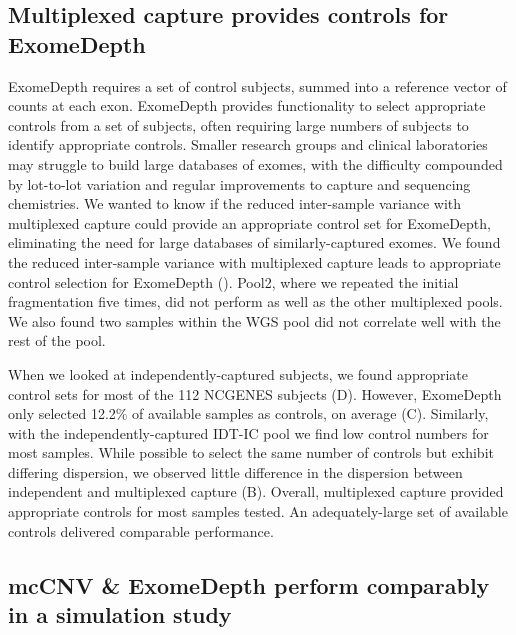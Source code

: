 \documentclass{bmcart}\usepackage[]{graphicx}\usepackage[]{color}
\begin{document}
\subsection{Multiplexed capture provides controls for ExomeDepth}

ExomeDepth requires a set of control subjects, summed into a reference vector of counts at each exon.
ExomeDepth provides functionality to select appropriate controls from a set of subjects, often requiring large numbers of subjects to identify appropriate controls.
Smaller research groups and clinical laboratories may struggle to build large databases of exomes, with the difficulty compounded by lot-to-lot variation and regular improvements to capture and sequencing chemistries.
We wanted to know if the reduced inter-sample variance with multiplexed capture could provide an appropriate control set for ExomeDepth, eliminating the need for large databases of similarly-captured exomes.
We found the reduced inter-sample variance with multiplexed capture leads to appropriate control selection for ExomeDepth ().
Pool2, where we repeated the initial fragmentation five times, did not perform as well as the other multiplexed pools.
We also found two samples within the WGS pool did not correlate well with the rest of the pool.

When we looked at independently-captured subjects, we found appropriate control sets for most of the 112 NCGENES subjects (D).
However, ExomeDepth only selected 12.2\% of available samples as controls, on average (C).
Similarly, with the independently-captured IDT-IC pool we find low control numbers for most samples.
While possible to select the same number of controls but exhibit differing dispersion, we observed little difference in the dispersion between independent and multiplexed capture (B).
Overall, multiplexed capture provided appropriate controls for most samples tested.
An adequately-large set of available controls delivered comparable performance.

\subsection{mcCNV \& ExomeDepth perform comparably in a simulation study}
\end{document}
